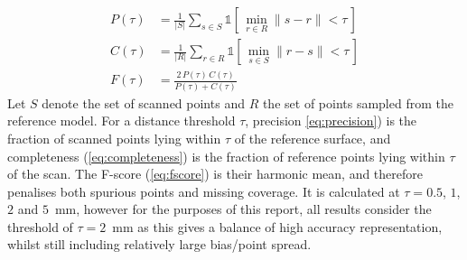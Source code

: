 \begin{align}
	P(\tau) &= \frac{1}{|S|} \sum_{s \in S}
	\mathbb{1}\!\left[\, \min_{r \in R} \lVert s - r \rVert < \tau \,\right] \label{eq:precision} \\
	C(\tau) &= \frac{1}{|R|} \sum_{r \in R}
	\mathbb{1}\!\left[\, \min_{s \in S} \lVert r - s \rVert < \tau \,\right] \label{eq:completeness} \\
	F(\tau) &= \frac{2\, P(\tau)\, C(\tau)}{P(\tau) + C(\tau)} \label{eq:fscore}
\end{align}
Let $S$ denote the set of scanned points and $R$ the set of points sampled from the reference model. For a distance threshold $\tau$, precision \autoref{eq:precision}) is the fraction of scanned points lying within $\tau$ of the reference surface, and completeness (\autoref{eq:completeness}) is the fraction of reference points lying within $\tau$ of the scan. The F-score (\autoref{eq:fscore}) is their harmonic mean, and therefore penalises both spurious points and missing coverage. It is calculated at $\tau = 0.5$, $1$, $2$ and $5$~mm, however for the purposes of this report, all results consider the threshold of $\tau = 2$~mm as this gives a balance of high accuracy representation, whilst still including relatively large bias/point spread.


